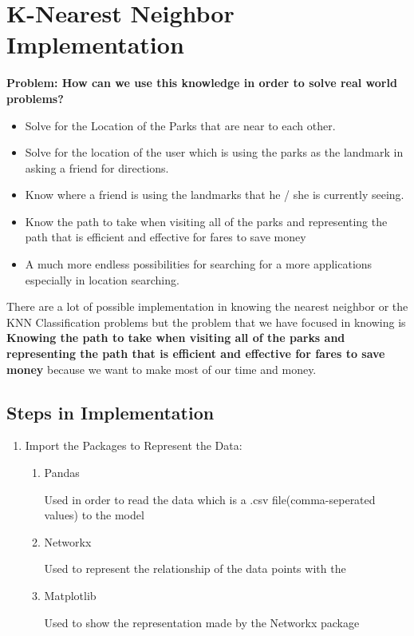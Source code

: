 \documentclass[letterpaper, 12pt]{article}
\begin{document}
    \section*{K-Nearest Neighbor Implementation}
        \textbf{Problem: How can we use this knowledge in order to solve real world problems?}
        \begin{itemize}
            \item Solve for the Location of the Parks that are near to each other.
            \item Solve for the location of the user which is using the parks as the landmark in asking a friend for directions.
            \item Know where a friend is using the landmarks that he / she is currently seeing.
            \item Know the path to take when visiting all of the parks and representing the path that is efficient and effective for fares to save money
            \item A much more endless possibilities for searching for a more applications especially in location searching.
        \end{itemize}
        \par There are a lot of possible implementation in knowing the nearest neighbor or the KNN Classification problems but the problem that we have focused in knowing is \textbf{ Knowing the path to take when visiting all of the parks and representing the path that is efficient and effective for fares to save money} because we want to make most of our time and money.
        \subsection{Steps in Implementation}
            \begin{enumerate}
                \item Import the Packages to Represent the Data:
                \begin{enumerate}
                    \item Pandas \par Used in order to read the data which is a .csv file(comma-seperated values) to the model
                    \item Networkx \par Used to represent the relationship of the data points with the 
                    \item Matplotlib \par Used to show the representation made by the Networkx package
                \end{enumerate}
            \end{enumerate}
\end{document}
